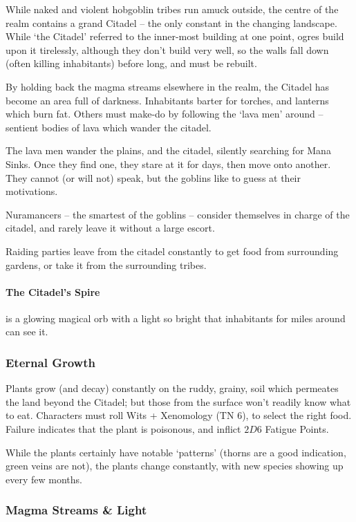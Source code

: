 \begin{multicols}{2}
While naked and violent hobgoblin tribes run amuck outside, the centre of the realm contains a grand Citadel -- the only constant in the changing landscape.
While `the Citadel' referred to the inner-most building at one point, ogres build upon it tirelessly, although they don't build very well, so the walls fall down (often killing inhabitants) before long, and must be rebuilt.

By holding back the magma streams elsewhere in the realm, the Citadel has become an area full of darkness.
Inhabitants barter for torches, and lanterns which burn fat.
Others must make-do by following the `lava men' around -- sentient bodies of lava which wander the citadel.

The lava men wander the plains, and the citadel, silently searching for Mana Sinks.
Once they find one, they stare at it for days, then move onto another.
They cannot (or will not) speak, but the goblins like to guess at their motivations.

Nuramancers -- the smartest of the goblins -- consider themselves in charge of the citadel, and rarely leave it without a large escort.

Raiding parties leave from the citadel constantly to get food from surrounding gardens, or take it from the surrounding tribes.

\paragraph{The Citadel's Spire}
is a glowing magical orb with a light so bright that inhabitants for miles around can see it.

\subsubsection{Eternal Growth}

Plants grow (and decay) constantly on the ruddy, grainy, soil which permeates the land beyond the Citadel; but those from the surface won't readily know what to eat.
Characters must roll Wits + Xenomology (TN 6), to select the right food.
Failure indicates that the plant is poisonous, and inflict $2D6$ Fatigue Points.

While the plants certainly have notable `patterns' (thorns are a good indication, green veins are not), the plants change constantly, with new species showing up every few months.

\subsubsection{Magma Streams \& Light}


\end{multicols}
